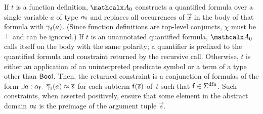 If $t$ is a function definition, %
$\conv_0$ constructs a quantified formula over a single variable
$a$ of type $\alpha_{\mathsf{f}}$ and replaces all occurrences of $\vec x$ in
the body of that formula with $\overline{\gamma}_{\mathsf{f}}( a )$.
(Since function definitions are top-level conjuncts, %
$\chi$ must be $\top$ and can be ignored.)
%
If $t$ is an unannotated quantified formula, $\conv_0$ calls itself
on the body with the same polarity; a quantifier is prefixed to the
quantified formula and constraint returned by the recursive call.
Otherwise, $t$ is either an application of an uninterpreted predicate symbol or a term
of a type other than $\mathsf{Bool}$. Then, the returned constraint is a conjunction of
formulas of the form $\exists a : {\alpha_{\mathsf{f}}}.\;\, \overline{\gamma}_{\mathsf{f}}(
a ) \approx \overline{s}$ for each subterm $\mathsf{f}( \overline{s} )$ of~$t$ such that $\con{f}
\in \sfundefs{\Sigma}$. Such constraints, when asserted positively, ensure that
some element in the abstract domain $\alpha_{\mathsf{f}}$ is the preimage of
the argument tuple $\vec s$. %


